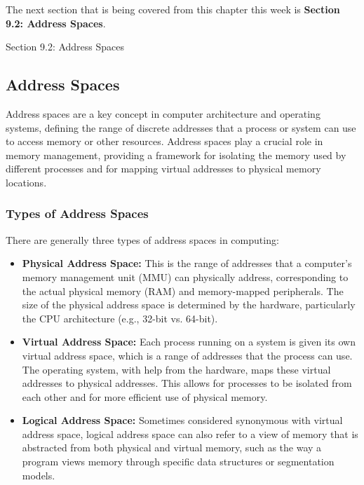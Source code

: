 The next section that is being covered from this chapter this week is \textbf{Section 9.2: Address Spaces}.

\begin{notes}{Section 9.2: Address Spaces}
    \subsection*{Address Spaces}

    Address spaces are a key concept in computer architecture and operating systems, defining the range of discrete addresses that a process or system can use to access memory or other resources. 
    Address spaces play a crucial role in memory management, providing a framework for isolating the memory used by different processes and for mapping virtual addresses to physical memory locations. \vspace*{1em}
    
    \subsubsection*{Types of Address Spaces}
    
    There are generally three types of address spaces in computing:
    
    \begin{itemize}
        \item \textbf{Physical Address Space:} This is the range of addresses that a computer's memory management unit (MMU) can physically address, corresponding to the actual physical memory (RAM) 
        and memory-mapped peripherals. The size of the physical address space is determined by the hardware, particularly the CPU architecture (e.g., 32-bit vs. 64-bit).
        \item \textbf{Virtual Address Space:} Each process running on a system is given its own virtual address space, which is a range of addresses that the process can use. The operating system, 
        with help from the hardware, maps these virtual addresses to physical addresses. This allows for processes to be isolated from each other and for more efficient use of physical memory.
        \item \textbf{Logical Address Space:} Sometimes considered synonymous with virtual address space, logical address space can also refer to a view of memory that is abstracted from both 
        physical and virtual memory, such as the way a program views memory through specific data structures or segmentation models.
    \end{itemize}
    

\end{notes}
